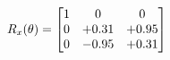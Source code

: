 \documentclass[preview]{standalone}
\begin{document}
\begin{align*}
\special{dvisvgm:raw <g id='unique000'>}R_{x}(\theta) = \begin{bmatrix}1 & 0 & 0 \\0 & +0.31 & +0.95 \\0 & -0.95 & +0.31\end{bmatrix}\special{dvisvgm:raw </g>}
\end{align*}
\end{document}
